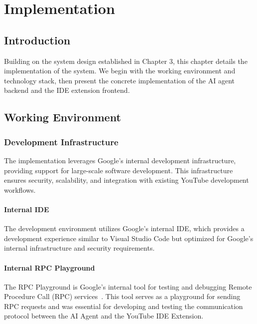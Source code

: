 \setcounter{chapter}{3}
\chapter{Implementation}
\minitoc %
\graphicspath{{Chapitre4/figures/}}

\pagestyle{fancy}
\fancyhf{}
\fancyhead[R]{\bfseries\rightmark}
\fancyfoot[R]{\thepage}
\renewcommand{\headrulewidth}{0.5pt}
\renewcommand{\footrulewidth}{0pt}
\renewcommand{\chaptermark}[1]{\markboth{{\chaptername~\thechapter. #1 }}{}}
\renewcommand{\sectionmark}[1]{\markright{\thechapter.\thesection~ #1}}

\begin{spacing}{1.2}

\section*{Introduction}
Building on the system design established in Chapter 3, this chapter details the implementation of the system. We begin with the working environment and technology stack, then present the concrete implementation of the AI agent backend and the IDE extension frontend.

\section{Working Environment}

\subsection{Development Infrastructure}
The implementation leverages Google's internal development infrastructure, providing support for large-scale software development. This infrastructure ensures security, scalability, and integration with existing YouTube development workflows.

\subsubsection{Internal IDE}
The development environment utilizes Google's internal IDE, which provides a development experience similar to Visual Studio Code but optimized for Google's internal infrastructure and security requirements.

\subsubsection{Internal RPC Playground}
The RPC Playground is Google's internal tool for testing and debugging Remote Procedure Call (RPC) services~\cite{rpc1984}. This tool serves as a playground for sending RPC requests and was essential for developing and testing the communication protocol between the AI Agent and the YouTube IDE Extension.


\end{spacing}
